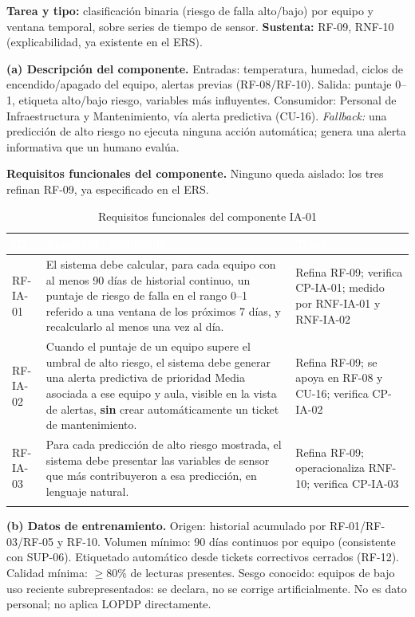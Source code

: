 \textbf{Tarea y tipo:} clasificaci\'on binaria (riesgo de falla alto/bajo) por equipo y ventana temporal, sobre series de tiempo de sensor. \textbf{Sustenta:} RF-09, RNF-10 (explicabilidad, ya existente en el ERS).

\textbf{(a) Descripci\'on del componente.} Entradas: temperatura, humedad, ciclos de encendido/apagado del equipo, alertas previas (RF-08/RF-10). Salida: puntaje 0--1, etiqueta alto/bajo riesgo, variables m\'as influyentes. Consumidor: Personal de Infraestructura y Mantenimiento, v\'ia alerta predictiva (CU-16). \emph{Fallback:} una predicci\'on de alto riesgo no ejecuta ninguna acci\'on autom\'atica; genera una alerta informativa que un humano eval\'ua.

\textbf{Requisitos funcionales del componente.} Ninguno queda aislado: los tres refinan RF-09, ya especificado en el ERS.

\begingroup
\small
\begin{longtable}{|p{2.1cm}|p{9.4cm}|p{3.4cm}|}
\hline
\cellcolor{sigagreen}\textcolor{white}{\textbf{ID}} & \cellcolor{sigagreen}\textcolor{white}{\textbf{Enunciado verificable}} & \cellcolor{sigagreen}\textcolor{white}{\textbf{Traza}} \\ \hline
RF-IA-01 & El sistema debe calcular, para cada equipo con al menos 90 d\'ias de historial continuo, un puntaje de riesgo de falla en el rango 0--1 referido a una ventana de los pr\'oximos 7 d\'ias, y recalcularlo al menos una vez al d\'ia. & Refina RF-09; verifica CP-IA-01; medido por RNF-IA-01 y RNF-IA-02 \\ \hline
RF-IA-02 & Cuando el puntaje de un equipo supere el umbral de alto riesgo, el sistema debe generar una alerta predictiva de prioridad Media asociada a ese equipo y aula, visible en la vista de alertas, \textbf{sin} crear autom\'aticamente un ticket de mantenimiento. & Refina RF-09; se apoya en RF-08 y CU-16; verifica CP-IA-02 \\ \hline
RF-IA-03 & Para cada predicci\'on de alto riesgo mostrada, el sistema debe presentar las variables de sensor que m\'as contribuyeron a esa predicci\'on, en lenguaje natural. & Refina RF-09; operacionaliza RNF-10; verifica CP-IA-03 \\ \hline
\caption{Requisitos funcionales del componente IA-01}
\end{longtable}
\endgroup

\textbf{(b) Datos de entrenamiento.} Origen: historial acumulado por RF-01/RF-03/RF-05 y RF-10. Volumen m\'inimo: 90 d\'ias continuos por equipo (consistente con SUP-06). Etiquetado autom\'atico desde tickets correctivos cerrados (RF-12). Calidad m\'inima: $\geq$80\% de lecturas presentes. Sesgo conocido: equipos de bajo uso reciente subrepresentados: se declara, no se corrige artificialmente. No es dato personal; no aplica LOPDP directamente.

